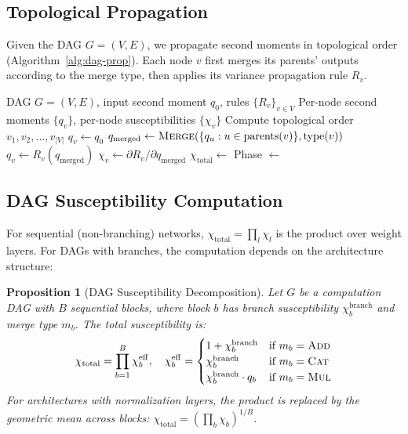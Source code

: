 \documentclass[10pt]{article}
\newtheorem{proposition}[theorem]{Proposition}
\begin{document}
\subsection{Topological Propagation}
\label{subsec:topo-prop}

Given the DAG $G = (V, E)$, we propagate second moments in topological order (Algorithm~\ref{alg:dag-prop}).  Each node $v$ first merges its parents' outputs according to the merge type, then applies its variance propagation rule $R_v$.

\begin{algorithm}[t]
\caption{DAG Variance Propagation}
\label{alg:dag-prop}
\begin{algorithmic}[1]
\Require DAG $G = (V,E)$, input second moment $q_0$, rules $\{R_v\}_{v \in V}$
\Ensure Per-node second moments $\{q_v\}$, per-node susceptibilities $\{\chi_v\}$
\State Compute topological order $v_1, v_2, \ldots, v_{|V|}$
        \State $q_v \gets q_0$
    \Else
        \State $q_{\mathrm{merged}} \gets \textsc{Merge}(\{q_u : u \in \mathrm{parents}(v)\}, \mathrm{type}(v))$ 
        \State $q_v \gets R_v(q_{\mathrm{merged}})$
        \State $\chi_v \gets \partial R_v / \partial q_{\mathrm{merged}}$
    \EndIf
\EndFor
\State $\chi_{\mathrm{total}} \gets$  
\State Phase $\gets$ 
\end{algorithmic}
\end{algorithm}

\subsection{DAG Susceptibility Computation}
\label{subsec:dag-chi}

For sequential (non-branching) networks, $\chi_{\mathrm{total}} = \prod_l \chi_l$ is the product over weight layers.
For DAGs with branches, the computation depends on the architecture structure:

\begin{proposition}[DAG Susceptibility Decomposition]
\label{prop:dag-chi}
Let $G$ be a computation DAG with $B$ sequential blocks, where block $b$ has branch susceptibility $\chi_b^{\mathrm{branch}}$ and merge type $m_b$.  The total susceptibility is:
\begin{equation}
    \chi_{\mathrm{total}} = \prod_{b=1}^B \chi_b^{\mathrm{eff}}, \quad
    \chi_b^{\mathrm{eff}} = \begin{cases}
        1 + \chi_b^{\mathrm{branch}} & \text{if } m_b = \textsc{Add} \\
        \chi_b^{\mathrm{branch}} & \text{if } m_b = \textsc{Cat} \\
        \chi_b^{\mathrm{branch}} \cdot q_b & \text{if } m_b = \textsc{Mul}
    \end{cases}
    \label{eq:dag-chi}
\end{equation}
For architectures with normalization layers, the product is replaced by the geometric mean across blocks: $\chi_{\mathrm{total}} = (\prod_b \chi_b)^{1/B}$.
\end{proposition}
\end{document}
